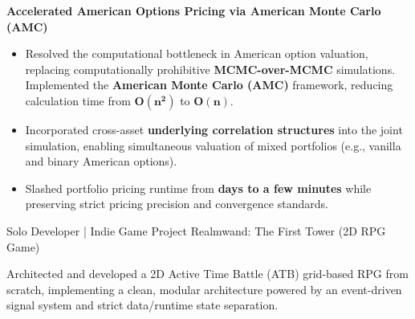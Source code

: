 \begin{cventries}
{\begin{cvitems}
\begin{itemize}
{      }
        \end{itemize}
      \vspace{0.5mm}
      \item {\textbf{Accelerated American Options Pricing via American Monte Carlo (AMC)}}
        \begin{itemize}
          \item {
            Resolved the computational bottleneck in American option valuation, 
            replacing computationally prohibitive 
            \textbf{MCMC-over-MCMC} simulations.
            Implemented the \textbf{American Monte Carlo (AMC)} framework, 
            reducing calculation time from $\mathbf{O(n^2)}$ to $\mathbf{O(n)}$.
          }
          \item {
            Incorporated cross-asset \textbf{underlying correlation structures} into the joint simulation, 
            enabling simultaneous valuation of mixed portfolios 
            (e.g., vanilla and binary American options).
          }
          \item {
            Slashed portfolio pricing runtime from \textbf{days to a few minutes} 
            while preserving strict pricing precision and convergence standards.
          }
        \end{itemize}
    \end{cvitems}
    \vspace{2.5mm}
  }
  \cventry
    {Solo Developer | Indie Game Project} %
    {Realmwand: The First Tower (2D RPG Game)} %
    {} %
    {} %
    {
      \begin{cvitems}
        \item {
          Architected and developed a 2D Active Time Battle (ATB) grid-based RPG from scratch, 
          implementing a clean, modular architecture powered by an event-driven signal system and 
          strict data/runtime state separation.
        }
      \end{cvitems}
    }


    


\end{cventries}
